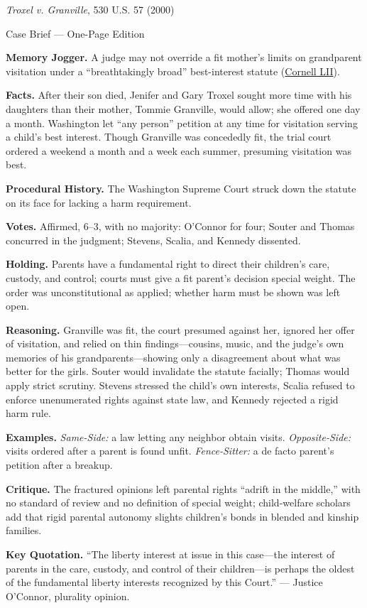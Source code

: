 \documentclass[12pt]{article}
\begin{document}
\begin{center}
{\Large \textit{Troxel v. Granville}, 530 U.S. 57 (2000)\par}
\vspace{0.3em}
{\normalsize Case Brief --- One-Page Edition\par}
\end{center}

\textbf{Memory Jogger.} A judge may not override a fit mother's limits on grandparent visitation under a ``breathtakingly broad'' best-interest statute (\href{https://www.law.cornell.edu/supremecourt/text/99-138}{Cornell LII}).

\textbf{Facts.} After their son died, Jenifer and Gary Troxel sought more time with his daughters than their mother, Tommie Granville, would allow; she offered one day a month. Washington let ``any person'' petition at any time for visitation serving a child's best interest. Though Granville was concededly fit, the trial court ordered a weekend a month and a week each summer, presuming visitation was best.

\textbf{Procedural History.} The Washington Supreme Court struck down the statute on its face for lacking a harm requirement.

\textbf{Votes.} Affirmed, 6--3, with no majority: O'Connor for four; Souter and Thomas concurred in the judgment; Stevens, Scalia, and Kennedy dissented.

\textbf{Holding.} Parents have a fundamental right to direct their children's care, custody, and control; courts must give a fit parent's decision special weight. The order was unconstitutional as applied; whether harm must be shown was left open.

\textbf{Reasoning.} Granville was fit, the court presumed against her, ignored her offer of visitation, and relied on thin findings---cousins, music, and the judge's own memories of his grandparents---showing only a disagreement about what was better for the girls. Souter would invalidate the statute facially; Thomas would apply strict scrutiny. Stevens stressed the child's own interests, Scalia refused to enforce unenumerated rights against state law, and Kennedy rejected a rigid harm rule.

\textbf{Examples.} \emph{Same-Side:} a law letting any neighbor obtain visits. \emph{Opposite-Side:} visits ordered after a parent is found unfit. \emph{Fence-Sitter:} a de facto parent's petition after a breakup.

\textbf{Critique.} The fractured opinions left parental rights ``adrift in the middle,'' with no standard of review and no definition of special weight; child-welfare scholars add that rigid parental autonomy slights children's bonds in blended and kinship families.

\textbf{Key Quotation.} ``The liberty interest at issue in this case---the interest of parents in the care, custody, and control of their children---is perhaps the oldest of the fundamental liberty interests recognized by this Court.'' --- Justice O'Connor, plurality opinion.
\end{document}
